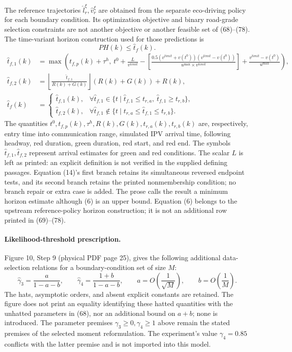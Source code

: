 \documentclass[10pt]{article}
\begin{document}
The reference trajectories \(\hat l_r^\xi,\hat v_r^\xi\) are obtained from the separate eco-driving policy for each boundary condition. Its optimization objective and binary road-grade selection constraints are not another objective or another feasible set of (68)--(78). The time-variant horizon construction used for those predictions is
\begin{equation}
PH(k)\leq\hat t_f(k).
\tag{6}
\end{equation}
\begin{equation}
\begin{aligned}
\hat t_{f,1}(k)&=\max\left(t_{f,p}(k)+\tau^h,\ t^0+\frac{L}{v^{limit}}
-\left[\frac{0.5(v^{limit}+v(t^0))(v^{limit}-v(t^0))}{u^{\max}\times v^{limit}}\right]
+\frac{v^{limit}-v(t^0)}{u^{\max}}\right),\\
\hat t_{f,2}(k)&=\left\lfloor\frac{\hat t_{f,1}}{R(k)+G(k)}\right\rfloor(R(k)+G(k))+R(k),\\
\hat t_f(k)&=\begin{cases}
\hat t_{f,1}(k),&\forall\hat t_{f,1}\in\{t\mid\hat t_{f,1}\leq t_{r,a},\ \hat t_{f,1}\geq t_{r,b}\},\\
\hat t_{f,2}(k),&\forall\hat t_{f,1}\notin\{t\mid t_{r,a}\leq\hat t_{f,1}\leq t_{r,b}\}.
\end{cases}
\end{aligned}
\tag{14}
\end{equation}
The quantities \(t^0,t_{f,p}(k),\tau^h,R(k),G(k),t_{r,a}(k),t_{r,b}(k)\) are, respectively, entry time into communication range, simulated IPV arrival time, following headway, red duration, green duration, red start, and red end. The symbols \(\hat t_{f,1},\hat t_{f,2}\) represent arrival estimates for green and red conditions. The scalar \(L\) is left as printed: an explicit definition is not verified in the supplied defining passages. Equation (14)'s first branch retains its simultaneous reversed endpoint tests, and its second branch retains the printed nonmembership condition; no branch repair or extra case is added. The prose calls the result a minimum horizon estimate although (6) is an upper bound. Equation (6) belongs to the upstream reference-policy horizon construction; it is not an additional row printed in (69)--(78).

\paragraph{Likelihood-threshold prescription.}
Figure 10, Step 9 (physical PDF page 25), gives the following additional data-selection relations for a boundary-condition set of size \(M\):
\[
\hat\gamma_3=\frac{a}{1-a-b},\qquad
\hat\gamma_4=\frac{1+b}{1-a-b},\qquad
 a=O\!\left(\frac1{\sqrt M}\right),\qquad b=O\!\left(\frac1M\right).
\]
The hats, asymptotic orders, and absent explicit constants are retained. The figure does not print an equality identifying these hatted quantities with the unhatted parameters in (68), nor an additional bound on \(a+b\); none is introduced. The parameter premises \(\gamma_3\geq0,\gamma_4\geq1\) above remain the stated premises of the selected moment reformulation. The experiment's value \(\gamma_4=0.85\) conflicts with the latter premise and is not imported into this model.
\end{document}
